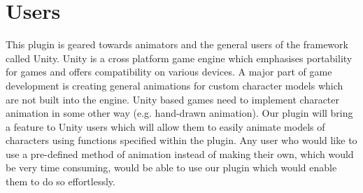 \section{Users}
This plugin is geared towards animators and the general users of the framework called Unity. Unity is a cross platform game engine which emphasises portability for games and offers compatibility on various devices. A major part of game development is creating general animations for custom character models which are not built into the engine. Unity based games need to implement character animation in some other way (e.g. hand-drawn animation). Our plugin will bring a feature to Unity users which will allow them to easily animate models of characters using functions specified within the plugin. Any user who would like to use a pre-defined method of animation instead of making their own, which would be very time consuming, would be able to use our plugin which would enable them to do so effortlessly.
